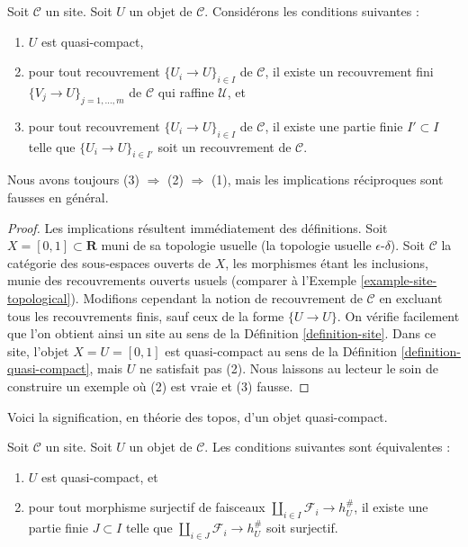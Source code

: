 \begin{lemma}
\label{lemma-conclude-quasi-compact}
Soit $\mathcal{C}$ un site. Soit $U$ un objet de $\mathcal{C}$.
Considérons les conditions suivantes :
\begin{enumerate}
\item $U$ est quasi-compact,
\item pour tout recouvrement $\{U_i \to U\}_{i \in I}$ de $\mathcal{C}$,
il existe un recouvrement fini $\{V_j \to U\}_{j = 1, \ldots, m}$
de $\mathcal{C}$ qui raffine $\mathcal{U}$, et
\item pour tout recouvrement $\{U_i \to U\}_{i \in I}$ de $\mathcal{C}$,
il existe une partie finie $I' \subset I$ telle que
$\{U_i \to U\}_{i \in I'}$ soit un recouvrement de $\mathcal{C}$.
\end{enumerate}
Nous avons toujours (3) $\Rightarrow$ (2) $\Rightarrow$ (1),
mais les implications réciproques sont fausses en général.
\end{lemma}

\begin{proof}
Les implications résultent immédiatement des définitions.
Soit $X = [0, 1] \subset \mathbf{R}$
muni de sa topologie usuelle (la topologie usuelle $\epsilon$-$\delta$).
Soit $\mathcal{C}$ la catégorie des sous-espaces ouverts de $X$, les
morphismes étant les inclusions, munie des recouvrements ouverts usuels (comparer à
l’Exemple \ref{example-site-topological}). Modifions cependant la notion
de recouvrement de $\mathcal{C}$ en excluant tous les recouvrements finis, sauf
ceux de la forme $\{U \to U\}$. On vérifie facilement que l’on obtient ainsi
un site au sens de la Définition \ref{definition-site}.
Dans ce site, l’objet $X = U = [0, 1]$ est quasi-compact au sens de la
Définition \ref{definition-quasi-compact}, mais $U$ ne satisfait pas (2).
Nous laissons au lecteur le soin de construire un exemple où (2) est vraie et (3) fausse.
\end{proof}

\noindent
Voici la signification, en théorie des topos, d’un objet quasi-compact.

\begin{lemma}
\label{lemma-quasi-compact}
Soit $\mathcal{C}$ un site. Soit $U$ un objet de $\mathcal{C}$.
Les conditions suivantes sont équivalentes :
\begin{enumerate}
\item $U$ est quasi-compact, et
\item pour tout morphisme surjectif de faisceaux
$\coprod_{i \in I} \mathcal{F}_i \to h_U^\#$,
il existe une partie finie $J \subset I$ telle que
$\coprod_{i \in J} \mathcal{F}_i \to h_U^\#$ soit surjectif.
\end{enumerate}
\end{lemma}

